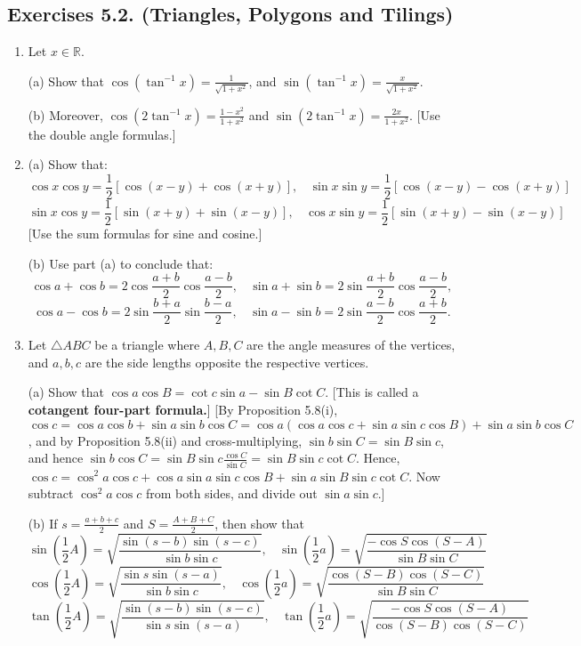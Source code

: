 \documentclass[leqno]{book}
\begin{document}
\subsection*{Exercises 5.2. (Triangles, Polygons and Tilings)} %
\begin{enumerate}
\item Let $x\in\mathbb R$.

(a) Show that $\cos(\tan^{-1}x)=\frac 1{\sqrt{1+x^2}}$, and $\sin(\tan^{-1}x)=\frac x{\sqrt{1+x^2}}$.

(b) Moreover, $\cos(2\tan^{-1}x)=\frac{1-x^2}{1+x^2}$ and $\sin(2\tan^{-1}x)=\frac{2x}{1+x^2}$.  [Use the double angle formulas.]

\item (a) Show that:
$$\cos x\cos y=\frac 12[\cos(x-y)+\cos(x+y)],~~~~\sin x\sin y=\frac 12[\cos(x-y)-\cos(x+y)]$$
$$\sin x\cos y=\frac 12[\sin(x+y)+\sin(x-y)],~~~~\cos x\sin y=\frac 12[\sin(x+y)-\sin(x-y)]$$
[Use the sum formulas for sine and cosine.]

(b) Use part (a) to conclude that:
$$\cos a+\cos b=2\cos\frac{a+b}2\cos\frac{a-b}2,~~~~\sin a+\sin b=2\sin\frac{a+b}2\cos\frac{a-b}2,$$
$$\cos a-\cos b=2\sin\frac{b+a}2\sin\frac{b-a}2,~~~~\sin a-\sin b=2\sin\frac{a-b}2\cos\frac{a+b}2.$$

\item Let $\triangle ABC$ be a triangle where $A,B,C$ are the angle measures of the vertices, and $a,b,c$ are the side lengths opposite the respective vertices.

(a) Show that $\cos a\cos B=\cot c\sin a-\sin B\cot C$.  [This is called a \textbf{cotangent four-part formula.}]  [By Proposition 5.8(i), $\cos c=\cos a\cos b+\sin a\sin b\cos C=\cos a(\cos a\cos c+\sin a\sin c\cos B)+\sin a\sin b\cos C$, and by Proposition 5.8(ii) and cross-multiplying, $\sin b\sin C=\sin B\sin c$, and hence $\sin b\cos C=\sin B\sin c\frac{\cos C}{\sin C}=\sin B\sin c\cot C$.  Hence, $\cos c=\cos^2a\cos c+\cos a\sin a\sin c\cos B+\sin a\sin B\sin c\cot C$.  Now subtract $\cos^2a\cos c$ from both sides, and divide out $\sin a\sin c$.]

(b) If $s=\frac{a+b+c}2$ and $S=\frac{A+B+C}2$, then show that
$$\sin\left(\frac 12A\right)=\sqrt{\frac{\sin(s-b)\sin(s-c)}{\sin b\sin c}},~~~~\sin\left(\frac 12a\right)=\sqrt{\frac{-\cos S\cos(S-A)}{\sin B\sin C}}$$
$$\cos\left(\frac 12A\right)=\sqrt{\frac{\sin s\sin(s-a)}{\sin b\sin c}},~~~~\cos\left(\frac 12a\right)=\sqrt{\frac{\cos(S-B)\cos(S-C)}{\sin B\sin C}}$$
$$\tan\left(\frac 12A\right)=\sqrt{\frac{\sin(s-b)\sin(s-c)}{\sin s\sin(s-a)}},~~~~\tan\left(\frac 12a\right)=\sqrt{\frac{-\cos S\cos(S-A)}{\cos(S-B)\cos(S-C)}}$$


\end{enumerate}
\end{document}
